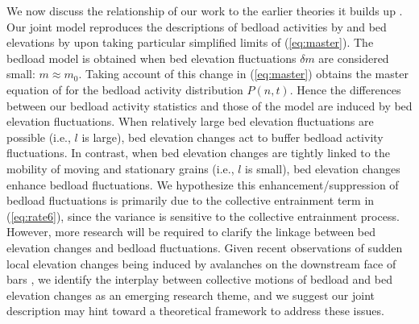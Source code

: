 \documentclass[draft]{agujournal2018}
\begin{document}
We now discuss the relationship of our work to the earlier theories it builds up \citep[e.g.][]{Ancey2008, Martin2014}.
Our joint model reproduces the descriptions of bedload activities by \citet{Ancey2008} and bed elevations by \citet{Martin2014} upon taking particular simplified limits of (\ref{eq:master}).
The \citet{Ancey2008} bedload model is obtained when bed elevation fluctuations $\delta m$ are considered small: $m \approx m_0$.
Taking account of this change in (\ref{eq:master}) obtains the master equation of \citet{Ancey2008} for the bedload activity distribution $P(n,t)$.
Hence the differences between our bedload activity statistics and those of the \citet{Ancey2008} model are induced by bed elevation fluctuations.
When relatively large bed elevation fluctuations are possible (i.e., $l$ is large), bed elevation changes act to buffer bedload activity fluctuations.
In contrast, when bed elevation changes are tightly linked to the mobility of moving and stationary grains (i.e., $l$ is small), bed elevation changes enhance bedload fluctuations.
We hypothesize this enhancement/suppression of bedload fluctuations is primarily due to the collective entrainment term in (\ref{eq:rate6}), since the \citet{Ancey2008} variance is sensitive to the collective entrainment process.
However, more research will be required to clarify the linkage between bed elevation changes and bedload fluctuations.
Given recent observations of sudden local elevation changes being induced by avalanches on the downstream face of bars \citep{Dhont2018}, we identify the interplay between collective motions of bedload and bed elevation changes as an emerging research theme, and we suggest our joint description may hint toward a theoretical framework to address these issues.
\end{document}
